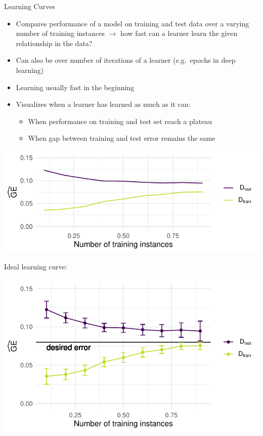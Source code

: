     \begin{frame}[c,allowframebreaks]{Learning Curves}

    \begin{itemize}
    \item Compares performance of a model on training and test data over a varying number of training instances $\rightarrow$ how fast can a learner learn the given relationship in the data?
    \item Can also be over number of iterations of a learner (e.g.\ epochs in deep learning)
    \item Learning usually fast in the beginning
    \item Visualizes when a learner has learned as much as it can:
    \begin{itemize}
    \item When performance on training and test set reach a plateau
    \item When gap between training and test error remains the same
    \end{itemize}
    \end{itemize}

    \begin{center}
    \includegraphics[height=.4\textheight]{learning-curve}
    \end{center}

    \framebreak

    Ideal learning curve:

    \begin{center}
    \includegraphics[height=.7\textheight]{learning-curve-ideal}
    \end{center}


\end{frame}
